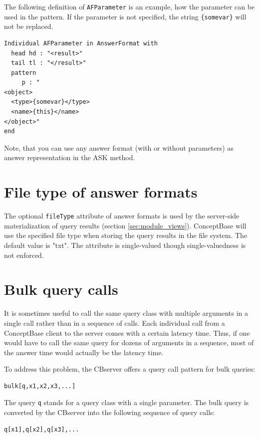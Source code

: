 The following definition of {\tt AFParameter} is an example, how
the parameter can be used in the pattern. If the parameter is not
specified, the string \verb+{somevar}+ will not be replaced.

{\small
\begin{verbatim}
Individual AFParameter in AnswerFormat with
  head hd : "<result>"
  tail tl : "</result>"
  pattern
     p : "
<object>
  <type>{somevar}</type>
  <name>{this}</name>
</object>"
end
\end{verbatim}
}

Note, that you can use any answer format (with or without parameters) as
answer representation in the ASK method.


\section{File type of answer formats}
\label{sec:af_filetype}

The optional {\tt fileType} attribute of answer formats is used by the server-side materialization
of query results (section \ref{sec:module_views}). ConceptBase will use the specified file type when
storing the query results in the file system. The default value is "txt". 
The attribute is single-valued though single-valuedness is not enforced. 


\section{Bulk query calls}
\label{sec:bulkqueries}

It is sometimes useful to call the same query class with multiple arguments in a single call
rather than in a sequence of calls. Each individual call from a ConceptBase client to the server
comes with a certain latency time. Thus, if one would have to call the same query 
for dozens of arguments in a sequence, most of the answer time would actually be the latency time.

To address this problem, the CBserver offers a query call pattern for bulk queries:

{\small
\begin{verbatim}
bulk[q,x1,x2,x3,...]
\end{verbatim}
}

The query {\tt q} stands for a query class with a single parameter. The bulk query is converted
by the CBserver into the following sequence of query calls:

{\small
\begin{verbatim}
q[x1],q[x2],q[x3],...
\end{verbatim}
}

